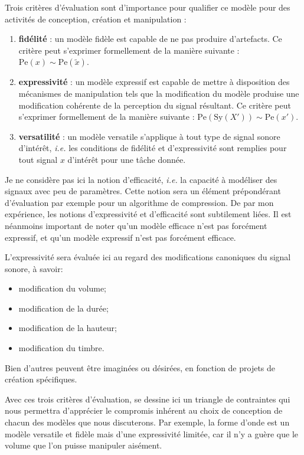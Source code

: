 Trois critères d'évaluation sont d'importance pour qualifier ce modèle pour des activités de conception, création et manipulation :
\begin{enumerate}
  \item\textbf{fidélité} : un modèle fidèle est capable de ne pas produire d'artefacts. Ce critère peut s'exprimer formellement de la manière suivante : $\mathrm{Pe}(x) \sim \mathrm{Pe}(\tilde{x})$.
  \item\textbf{expressivité} : un modèle expressif est capable de mettre à disposition des mécanismes de manipulation tels que la modification du modèle produise une modification cohérente de la perception du signal résultant. Ce critère peut s'exprimer formellement de la manière suivante : $\mathrm{Pe}(\mathrm{Sy}(X')) \sim \mathrm{Pe}(x')$.
  \item\textbf{versatilité} : un modèle versatile s'applique à tout type de signal sonore d'intérêt, \textit{i.e.} les conditions de fidélité et d'expressivité sont remplies pour tout signal $x$ d'intérêt pour une tâche donnée.
\end{enumerate}
Je ne considère pas ici la notion d'efficacité, \textit{i.e.} la capacité à modéliser des signaux avec peu de paramètres. Cette notion sera un élément prépondérant d'évaluation par exemple pour un algorithme de compression. De par mon expérience, les notions d'expressivité et d'efficacité sont subtilement liées. Il est néanmoins important de noter qu'un modèle efficace n'est pas forcément expressif, et qu'un modèle expressif n'est pas forcément efficace.

L'expressivité sera évaluée ici au regard des modifications canoniques du signal sonore, à savoir:
\begin{itemize}
  \item modification du volume;
  \item modification de la durée;
  \item modification de la hauteur;
  \item modification du timbre.
\end{itemize}
Bien d'autres peuvent être imaginées ou désirées, en fonction de projets de création spécifiques.

Avec ces trois critères d'évaluation, se dessine ici un triangle de contraintes qui nous permettra d'apprécier le compromis inhérent au choix de conception de chacun des modèles que nous discuterons. Par exemple, la forme d'onde est un modèle versatile et fidèle mais d'une expressivité limitée, car il n'y a guère que le volume que l'on puisse manipuler aisément.

